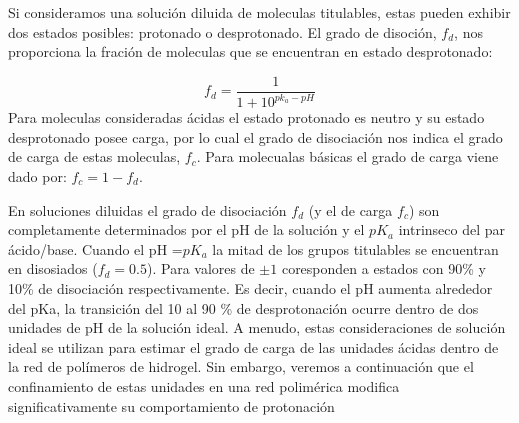 Si consideramos una soluci\'on diluida de moleculas titulables, estas pueden exhibir dos estados posibles: protonado o desprotonado. El grado de disoción, $f_d$, nos proporciona la fraci\'on de moleculas que se encuentran en estado desprotonado:




\begin{equation}
    f_d = \frac{1}{1+10^{pk_a -pH}}
    \label{eq:diso}
\end{equation}
Para moleculas consideradas \'acidas el estado protonado es neutro y su estado desprotonado posee carga, por lo cual el grado de disociaci\'on nos indica el grado de carga de estas moleculas, $f_c$.
Para molecualas b\'asicas el grado de carga viene dado por: $f_c =1- f_d$.

En soluciones diluidas el grado de disociación $f_d$ (y el de carga $f_c$) son completamente determinados por el pH de la soluci\'on y el $pK_a$ intrinseco del par \'acido/base. 
Cuando el pH =$pK_a$ la mitad de los grupos titulables se encuentran en disosiados ($f_d = 0.5$). Para valores de $\pm 1$ coresponden a estados con 90\% y 10\% de disociaci\'on respectivamente.
Es decir, cuando el pH aumenta alrededor del pKa, la transici\'on del 10 al 90 \% de desprotonaci\'on ocurre dentro de dos unidades de pH de la soluci\'on ideal. A menudo, estas consideraciones de soluci\'on ideal se utilizan para estimar el grado de carga de las unidades \'acidas dentro de la red de pol\'imeros de hidrogel. Sin embargo, veremos a continuaci\'on que el confinamiento de estas unidades en una red polim\'erica modifica significativamente su comportamiento de protonaci\'on


